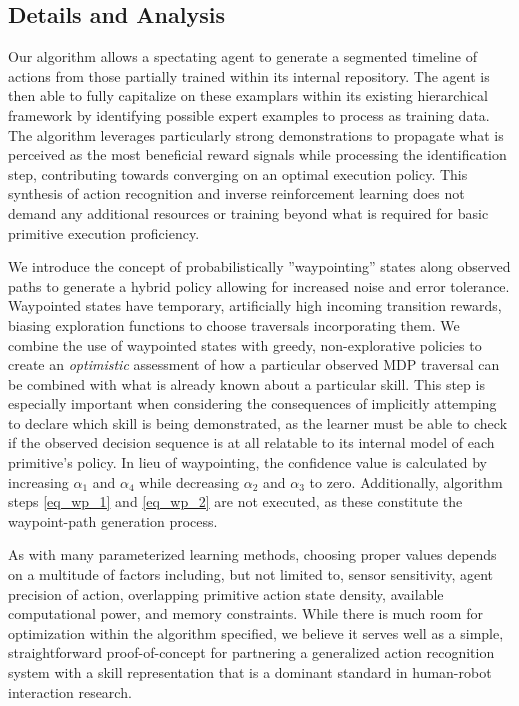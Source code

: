 \documentclass[letterpaper]{article}
\begin{document}
\subsection{Details and Analysis}
\label{sec:recognition_analysis}
Our algorithm allows a spectating agent to generate a segmented timeline of actions from those partially trained within its internal repository. The agent is then able to fully capitalize on these examplars within its existing hierarchical framework by identifying possible expert examples to process as training data. The algorithm leverages particularly strong demonstrations to propagate what is perceived as the most beneficial reward signals while processing the identification step, contributing towards converging on an optimal execution policy. This synthesis of action recognition and inverse reinforcement learning does not demand any additional resources or training beyond what is required for basic primitive execution proficiency.

We introduce the concept of probabilistically ''waypointing'' states along observed paths to generate a hybrid policy allowing for increased noise and error tolerance. Waypointed states have temporary, artificially high incoming transition rewards, biasing exploration functions to choose traversals incorporating them. We combine the use of waypointed states with greedy, non-explorative policies to create an \textit{optimistic} assessment of how a particular observed MDP traversal can be combined with what is already known about a particular skill. This step is especially important when considering the consequences of implicitly attemping to declare which skill is being demonstrated, as the learner must be able to check if the observed decision sequence is at all relatable to its internal model of each primitive's policy. In lieu of waypointing, the confidence value is calculated by increasing $\alpha_1$ and $\alpha_4$ while decreasing $\alpha_2$ and $\alpha_3$ to zero. Additionally, algorithm steps \ref{eq_wp_1} and \ref{eq_wp_2} are not executed, as these constitute the waypoint-path generation process.

As with many parameterized learning methods, choosing proper values depends on a multitude of factors including, but not limited to, sensor sensitivity, agent precision of action, overlapping primitive action state density, available computational power, and memory constraints. While there is much room for optimization within the algorithm specified, we believe it serves well as a simple, straightforward proof-of-concept for partnering a generalized action recognition system with a skill representation that is a dominant standard in human-robot interaction research.
\end{document}
